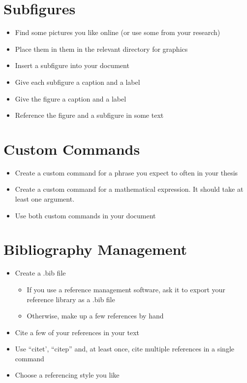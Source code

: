 \documentclass[11pt,a4paper]{article}
\begin{document}
\section{Subfigures}
\begin{itemize}
\item Find some pictures you like online (or use some from your research)
\item Place them in them in the relevant directory for graphics
\item Insert a subfigure into your document
\item Give each subfigure a caption and a label
\item Give the figure a caption and a label
\item Reference the figure and a subfigure in some text
\end{itemize}

\section{Custom Commands}
\begin{itemize}
\item Create a custom command for a phrase you expect to often in your thesis
\item Create a custom command for a mathematical expression. It should take at least one argument.
\item Use both custom commands in your document
\end{itemize}

\section{Bibliography Management}
\begin{itemize}
\item Create a .bib file
\begin{itemize}
\item If you use a reference management software, ask it to export your reference library as a .bib file
\item Otherwise, make up a few references by hand
\end{itemize}
\item Cite a few of your references in your text
\item Use ``citet', ``citep'' and, at least once,  cite multiple references in a single command
\item Choose a referencing style you like
\end{itemize}
\end{document}
